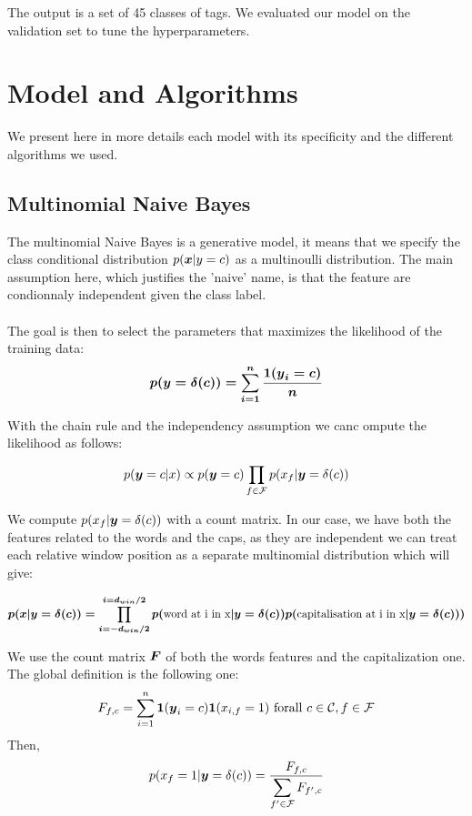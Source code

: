 \documentclass[11pt]{article}
\begin{document}
The output is a set of 45 classes of tags. We evaluated our model on the validation set to tune the hyperparameters.


\section{Model and Algorithms}

We present here in more details each model with its specificity and the different algorithms we used.

\subsection{Multinomial Naive Bayes}

The multinomial Naive Bayes \cite{murphy2012machine} is a generative model, it means that we specify the class conditional distribution $p(\boldsymbol{x} | y=c)$ as a multinoulli distribution. The main assumption here, which  justifies the 'naive' name, is that the feature are condionnaly independent given the class label.\\ \\
The goal is then to select the parameters that maximizes the likelihood of the training data:
    \[p(\boldsymbol{y} = \boldmath{\delta(c)}) = \sum_{i = 1}^n \frac{1(\boldsymbol{y}_i = c)}{n}\]

\noindent With the chain rule and the independency assumption we canc ompute the likelihood as follows:

\[ p(\boldsymbol{y} = c | x) \propto p(\boldsymbol{y} = c) \prod_{f \in \mathcal{F}} p(x_f| \boldsymbol{y}=\boldmath{\delta(c)})\]

\noindent We compute $p(x_f| \boldsymbol{y}=\boldmath{\delta(c)})$ with a count matrix. In our case, we have both the features related to the words and the caps, as they are independent we can treat each relative window position as a separate multinomial distribution which will give:

\[ p(x| \boldsymbol{y}=\boldmath{\delta(c)}) = \prod_{i = -d_{win}/2}^{i =d_{win}/2} p(\text{word at i in x}| \boldsymbol{y}=\boldmath{\delta(c)}) p(\text{capitalisation at i in x} | \boldsymbol{y}=\boldmath{\delta(c)}))\]


\noindent We use the count matrix $\boldsymbol{F}$ of both the words features and the capitalization one. The global definition is the following one:
\[F_{f,c} = \sum_{i = 1}^n \mathbf{1}(\boldsymbol{y}_i = c) \mathbf{1}(x_{i, f} = 1) \mathrm{\ for all\ } c\in \mathcal{C}, f\in \mathcal{F}\] 
Then,
      \[p(x_f = 1 | \boldsymbol{y}=\boldmath{\delta(c)}) = \frac{F_{f, c}}{\displaystyle \sum_{f' \in \mathcal{F}} F_{f',c}}  \]
\end{document}
